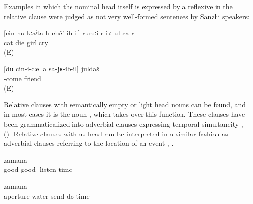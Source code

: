 Examples in which the nominal head itself is expressed by a reflexive in the relative clause were judged as not very well-formed sentences by Sanzhi speakers:
%
\begin{exe}
	\ex	\label{ex:The girl whose cat died is crying}
		[cin-na	kːaˁta	b-ebč'-ib-il]	rursːi	r-isː-ul	ca-r\\
		{}		cat	die	girl	cry	\\
	\glt	{} (E)

	\ex	\label{ex:The friend with whom I came goes to Derbent tomorrow}
		[du	cin-i-cːella	sa-jʁ-ib-il]	juldaš	\\
		{}			-come	friend	\\
	\glt	{} (E)
\end{exe}

Relative clauses with semantically empty or light head nouns can be found, and in most cases it is the noun , which takes over this function. These clauses have been grammaticalized into adverbial clauses expressing temporal simultaneity ,  (). Relative clauses with   as head can be interpreted in a similar fashion as adverbial clauses referring to the location of an event , .
%
\begin{exe}
	\ex	\label{ex:at the time (when they) were listening carefully}
		zamana\\
		good	good	-listen	time\\
	\glt	{}

	\ex	\label{ex:at the time (when) you send the water from the aperture}
		zamana\\
		aperture		water	send-do	time\\
	\glt	{}
\end{exe}

